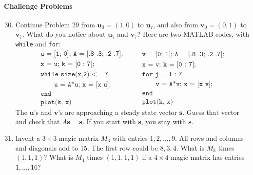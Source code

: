 \documentclass[14pt, a4paper]{article}
\begin{document}
\paragraph{Challenge Problems}
\begin{enumerate}
    \setcounter{enumi}{29}
    \item Continue Problem 29 from $\boldsymbol{u}_0 = (1,0)$ to $\boldsymbol{u}_7$, and also from $\boldsymbol{v}_0 = (0,1)$ to $\boldsymbol{v}_7$. What do you notice about $\boldsymbol{u}_7$ and $\boldsymbol{v}_7$? Here are two \textcolor{blue!60!white}{MATLAB} codes, with \texttt{while} and \texttt{for}:
          \[
              \begin{array}{l}
                  \texttt{u = [1; 0]; A = [.8 .3; .2 .7];} \\
                  \texttt{x = u; k = [0 : 7];}             \\
                  \texttt{while size(x,2) <= 7}            \\
                  \qquad \texttt{u = A*u; x = [x u];}      \\
                  \texttt{end}                             \\
                  \texttt{plot(k, x)}
              \end{array}
              \qquad
              \begin{array}{l}
                  \texttt{v = [0; 1]; A = [.8 .3; .2 .7];} \\
                  \texttt{x = v; k = [0 : 7];}             \\
                  \texttt{for j = 1 : 7}                   \\
                  \qquad \texttt{v = A*v; x = [x v];}      \\
                  \texttt{end}                             \\
                  \texttt{plot(k, x)}
              \end{array}
          \]
          The $\boldsymbol{u}$'s and $\boldsymbol{v}$'s are approaching a steady state vector $\boldsymbol{s}$. Guess that vector and check that $A\boldsymbol{s} = \boldsymbol{s}$. If you start with $\boldsymbol{s}$, you stay with $\boldsymbol{s}$.

    \item Invent a $3 \times 3$ magic matrix $M_3$ with entries $1,2,\dots,9$. All rows and columns and diagonals add to 15. The first row could be $8,3,4$. What is $M_3$ times $(1,1,1)$? What is $M_4$ times $(1,1,1,1)$ if a $4 \times 4$ magic matrix has entries $1,\dots,16$?


\end{enumerate}
\end{document}
